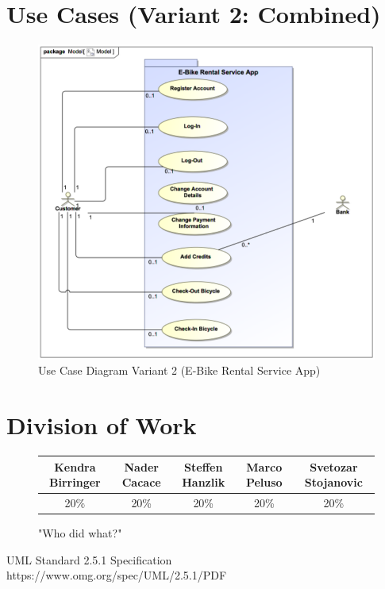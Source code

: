 \documentclass[a4paper, 12pt]{article}
\begin{document}
\newpage
\section{Use Cases (Variant 2: Combined)}
\begin{figure}[!ht]
\begin{center}
\includegraphics[scale=0.5]{02-e-bike-rental-service-variant-2.png}
\end{center}
\caption{Use Case Diagram Variant 2 (E-Bike Rental Service App)}
\end{figure}

\newpage
\section{Division of Work}
\begin{figure}[!ht]
\renewcommand{\arraystretch}{1.5}
\begin{tabular}{|c|c|c|c|c|}
\hline
Kendra Birringer    & Nader Cacace  & Steffen Hanzlik   & Marco Peluso  & Svetozar Stojanovic\\
\hline
20\%                & 20\%          & 20\%              & 20\%          & 20\%\\
\hline
\end{tabular}
\caption{"Who did what?"}
\end{figure}
\newpage

\begin{thebibliography}{2}

UML Standard 2.5.1 Specification\\
https://www.omg.org/spec/UML/2.5.1/PDF

\end{thebibliography}
\end{document}
